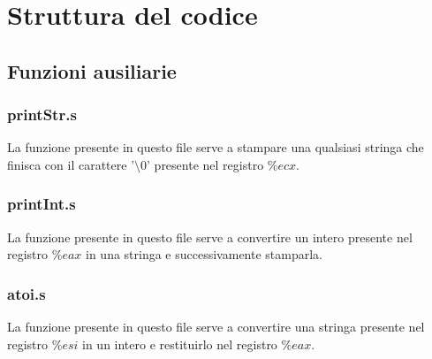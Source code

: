 \documentclass[a4paper]{article}
\begin{document}


\tableofcontents
\pagebreak

\section{Struttura del codice}
\subsection{Funzioni ausiliarie}
\subsubsection{printStr.s}
La funzione presente in questo file serve a stampare una qualsiasi stringa che finisca
con il carattere '\( \setminus 0\)'  presente nel registro \( \%ecx \).

\subsubsection{printInt.s}
La funzione presente in questo file serve a convertire un intero presente nel registro
\( \%eax \)  in una stringa e successivamente stamparla.

\subsubsection{atoi.s}
La funzione presente in questo file serve a convertire una stringa presente nel registro
\( \%esi \) in un intero e restituirlo nel registro \( \%eax \).
\end{document}
